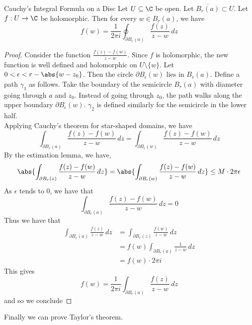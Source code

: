 \documentclass[a4paper]{article}
\begin{document}
\begin{thm}{Cauchy's Integral Formula on a Disc}{} Let $U\subseteq\C$ be open. Let $\overline{B_r(a)}\subset U$. Let $f:U\to\C$ be holomorphic. Then for every $w\in B_r(a)$, we have $$f(w)=\frac{1}{2\pi i}\oint_{\partial B_r(a)}\frac{f(z)}{z-w}\,dz$$ 
\begin{proof}
Consider the function $\frac{f(z)-f(w)}{z-w}$. Since $f$ is holomorphic, the new function is well defined and holomorphic on $U\setminus\{w\}$. Let $0<\epsilon<r-\abs{w-z_0}$. Then the circle $\partial B_\epsilon(w)$ lies in $B_r(a)$. Define a path $\gamma_1$ as follows. Take the boundary of the semicircle $B_r(a)$ with diameter going through $a$ and $z_0$. Instead of going through $z_0$, the path walks along the upper boundary $\partial B_\epsilon(w)$. $\gamma_2$ is defined similarly for the semicircle in the lower half. \\

Applying Cauchy's theorem for star-shaped domains, we have $$\int_{\partial B_r(a)}\frac{f(z)-f(w)}{z-w}\,dz=\int_{\partial B_\epsilon(w)}\frac{f(z)-f(w)}{z-w}\,dz$$ By the estimation lemma, we have, $$\abs{\int_{\partial B_r(z)}\frac{f(z)-f(w)}{z-w}\,dz}=\abs{\int_{\partial B_\epsilon(w)}\frac{f(z)-f(w)}{z-w}\,dz}\leq M\cdot 2\pi\epsilon$$ As $\epsilon$ tends to $0$, we have that $$\int_{\partial B_r(a)}\frac{f(z)-f(w)}{z-w}\,dz=0$$ Thus we have that 
\begin{align*}
\int_{\partial B_r(a)}\frac{f(z)}{z-w}\,dz&=\int_{\partial B_r(z)}\frac{f(w)}{z-w}\,dz\\
&=f(w)\int_{\partial B_r(a)}\frac{1}{z-w}\,dz\\
&=f(w)\cdot 2\pi i
\end{align*} This gives $$f(w)=\frac{1}{2\pi i}\int_{\partial B_r(a)}\frac{f(z)}{z-w}\,dz$$ and so we conclude
\end{proof}
\end{thm}

Finally we can prove Taylor's theorem. 
\end{document}
